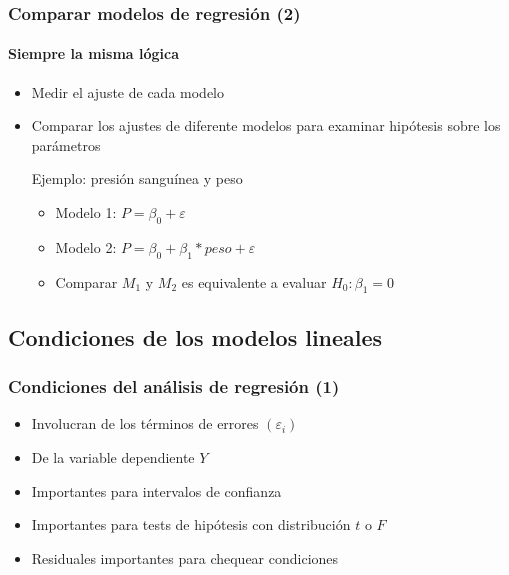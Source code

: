 \documentclass[gray,handout,mathserif]{beamer}
\begin{document}
 
\begin{frame}[label=compregrmod2]
   \frametitle{Comparar modelos de regresi\'on (2)}
   \framesubtitle{Siempre la misma l\'ogica}
    \begin{itemize}
      \item Medir el ajuste de cada modelo
      \item Comparar los ajustes de diferente modelos para examinar hip\'otesis sobre los par\'ametros
      \medskip
      \begin{exampleblock}{Ejemplo: presi\'on sangu\'inea y peso}
         \begin{itemize}
            \item Modelo 1: $P = \beta_0 + \varepsilon$
            \item Modelo 2: $P = \beta_0 + \beta_1*peso + \varepsilon $
            \item Comparar $M_1$ y $M_2$ es equivalente a evaluar $H_0: \beta_1 = 0$
         \end{itemize}
      \end{exampleblock}
   \end{itemize}
\end{frame}%


\subsection[Condiciones]{Condiciones de los modelos lineales}
 
\begin{frame}[label=regrassum1]
   \frametitle{Condiciones del an\'alisis de regresi\'on (1)}
    \begin{itemize}
      \item Involucran de los t\'erminos de errores $(\varepsilon_i)$
      \item De la variable dependiente $Y$
      \item Importantes para intervalos de confianza 
      \item Importantes para tests de hip\'otesis con distribuci\'on $t$ o $F$
      \item Residuales importantes para chequear condiciones
   \end{itemize}
\end{frame}%
\end{document}
